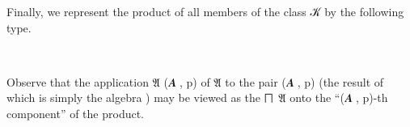 \ccpad
Finally, we represent the product of all members of the class \ab 𝒦 by the following type.
\ccpad
\begin{code}%
\>[0][@{}l@{\AgdaIndent{0}}]%
\>[1]\AgdaSpace{}%
\AgdaSymbol{:}\AgdaSpace{}%
\AgdaSpace{}%
\AgdaSymbol{(}\AgdaSpace{}%
\AgdaSymbol{)}\AgdaSpace{}%
\<%
\\
%
\>[1]\AgdaSpace{}%
\AgdaSymbol{=}\AgdaSpace{}%
\AgdaSpace{}%
\<%
\end{code}
\ccpad
Observe that the application \af 𝔄 (\ab 𝑨 , \ab p) of \af 𝔄 to the pair (\ab 𝑨 , \ab p) (the result of which is simply the algebra ) may be viewed as the  \af ⨅~\af 𝔄 onto the ``(\ab 𝑨 , \ab p)-th component'' of the product.





